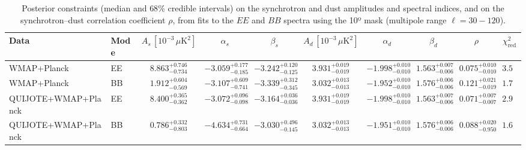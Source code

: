 \begin{table}[h]
\centering
\scriptsize
\setlength{\tabcolsep}{4pt}
\caption{Posterior constraints (median and $68\%$ credible intervals) on the synchrotron and dust amplitudes and spectral indices, and on the synchrotron--dust correlation coefficient $\rho$, from fits to the $EE$ and $BB$ spectra using the 10º mask (multipole range $\ell=30-120$).}
\label{tab:fit_all_pairs_ell30-120}
\begin{tabular}{llcccccccc}
\toprule
Data & Mode & $A_s\,[10^{-3}\,\mu\mathrm{K}^2]$ & $\alpha_s$ & $\beta_s$ & $A_d\,[10^{-3}\,\mu\mathrm{K}^2]$ & $\alpha_d$ & $\beta_d$ & $\rho$ & $\chi^2_\mathrm{red}$ \\
\midrule
WMAP+Planck & EE & $8.863^{+0.746}_{-0.734}$ & $-3.059^{+0.177}_{-0.185}$ & $-3.242^{+0.120}_{-0.125}$ & $3.931^{+0.019}_{-0.019}$ & $-1.998^{+0.010}_{-0.010}$ & $1.563^{+0.007}_{-0.006}$ & $0.075^{+0.010}_{-0.010}$ & $3.55$ \\
WMAP+Planck & BB & $1.912^{+0.604}_{-0.569}$ & $-3.107^{+0.609}_{-0.741}$ & $-3.339^{+0.312}_{-0.345}$ & $3.032^{+0.013}_{-0.013}$ & $-1.952^{+0.010}_{-0.010}$ & $1.576^{+0.006}_{-0.006}$ & $0.121^{+0.021}_{-0.019}$ & $1.79$ \\
QUIJOTE+WMAP+Planck & EE & $8.400^{+0.365}_{-0.362}$ & $-3.072^{+0.096}_{-0.098}$ & $-3.164^{+0.036}_{-0.036}$ & $3.931^{+0.019}_{-0.019}$ & $-1.998^{+0.010}_{-0.010}$ & $1.563^{+0.007}_{-0.006}$ & $0.071^{+0.007}_{-0.007}$ & $2.95$ \\
QUIJOTE+WMAP+Planck & BB & $0.786^{+0.332}_{-0.803}$ & $-4.634^{+0.731}_{-0.664}$ & $-3.030^{+0.496}_{-0.145}$ & $3.032^{+0.013}_{-0.013}$ & $-1.951^{+0.010}_{-0.010}$ & $1.576^{+0.006}_{-0.006}$ & $0.088^{+0.020}_{-0.950}$ & $1.64$ \\
\bottomrule
\end{tabular}
\end{table}
